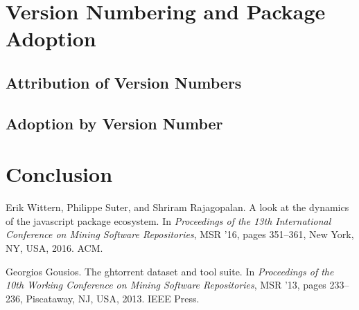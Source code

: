 \documentclass[10pt,conference]{IEEEtran}
\begin{document}
\section{Version Numbering and Package Adoption}

\subsection{Attribution of Version Numbers}

\subsection{Adoption by Version Number}

\section{Conclusion}


\begin{thebibliography}{00}
  Erik Wittern, Philippe Suter, and Shriram Rajagopalan.
  \newblock A look at the dynamics of the javascript package ecosystem.
  \newblock In {\em Proceedings of the 13th International Conference on Mining
    Software Repositories}, MSR '16, pages 351--361, New York, NY, USA, 2016.
    ACM.

  Georgios Gousios.
  \newblock The ghtorrent dataset and tool suite.
  \newblock In {\em Proceedings of the 10th Working Conference on Mining Software
    Repositories}, MSR '13, pages 233--236, Piscataway, NJ, USA, 2013. IEEE
    Press.


\end{thebibliography}
\vspace{12pt}
\end{document}
